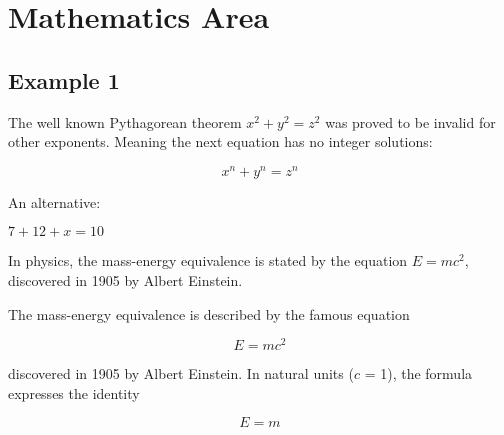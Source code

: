 \chapter{Mathematics Area}
\section{Example 1}

The well known Pythagorean theorem \(x^2 + y^2 = z^2\) was 
proved to be invalid for other exponents. 
Meaning the next equation has no integer solutions:
 
\[ x^n + y^n = z^n \]

 An alternative:

\begin{center}
    \begin{math}
        7+12+x=10
    \end{math}
\end{center}

In physics, the mass-energy equivalence is stated 
by the equation $E=mc^2$, discovered in 1905 by Albert Einstein.

The mass-energy equivalence is described by the famous equation
 
$$E=mc^2$$
 
discovered in 1905 by Albert Einstein. 
In natural units ($c$ = 1), the formula expresses the identity
 
\begin{equation}
E=m
\end{equation}